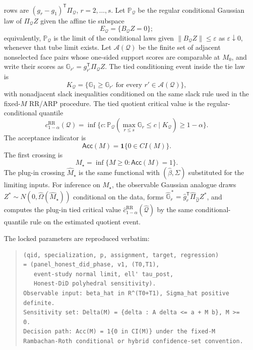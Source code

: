 \documentclass[11pt]{article}
\renewcommand{\Pr}{\mathbb{P}}
\newcommand{\one}{\mathbf{1}}
\newcommand{\transpose}{\mathsf{T}}
\theoremstyle{definition}
\theoremstyle{plain}
\theoremstyle{remark}
\begin{document}
rows are \((g_r-g_1)^\transpose\Pi_{\mathcal{Q}}\), \(r=2,\ldots,s\).  Let
\(\Pr_{\mathcal{Q}}\) be the regular conditional Gaussian law of
\(\Pi_{\mathcal{Q}}Z\) given the affine tie subspace
\[
E_{\mathcal{Q}}=\{B_{\mathcal{Q}}Z=0\};
\]
equivalently, \(\Pr_{\mathcal{Q}}\) is the limit of the conditional laws given
\(\|B_{\mathcal{Q}}Z\|\le\varepsilon\) as \(\varepsilon\downarrow 0\), whenever
that tube limit exists.  Let \(\mathcal{A}(\mathcal{Q})\) be the finite set of
adjacent nonselected face pairs whose one-sided support scores are comparable
at \(M_0\), and write their scores as
\(\mathbb{G}_{r'}=g_{r'}^\transpose\Pi_{\mathcal{Q}}Z\).  The tied
conditioning event inside the tie law is
\[
K_{\mathcal{Q}}
=\{\mathbb{G}_1
\ge \mathbb{G}_{r'}\text{ for every }r'\in\mathcal{A}(\mathcal{Q})\},
\]
with nonadjacent slack inequalities conditioned on the same slack rule used in
the fixed-\(M\) RR/ARP procedure.  The tied quotient critical value is the
regular-conditional quantile
\[
c_{1-\alpha}^{\mathrm{RR}}(\mathcal{Q})
=\inf\{c:\Pr_{\mathcal{Q}}(\max_{r\le s}\mathbb{G}_r\le c\mid
K_{\mathcal{Q}})\ge 1-\alpha\}.
\]
The acceptance indicator is
\[
\mathsf{Acc}(M)=\one\{0\in CI(M)\}.
\]
The first crossing is
\[
M_\star=\inf\{M\ge 0:\mathsf{Acc}(M)=1\}.
\]
The plug-in crossing \(\widehat M_\star\) is the same functional with
\((\widehat\beta,\widehat\Sigma)\) substituted for the limiting inputs.
For inference on \(M_\star\), the observable Gaussian analogue draws
\(Z^\ast\sim N(0,\widehat\Omega(\widehat M_\star))\) conditional on the data,
forms \(\widehat{\mathbb{G}}_r^{\,\ast}
=\widehat g_r^\transpose\widehat\Pi_{\widehat{\mathcal{Q}}}Z^\ast\), and
computes the plug-in tied critical value
\(\widehat c_{1-\alpha}^{\mathrm{RR}}(\widehat{\mathcal{Q}})\) by the same
conditional-quantile rule on the estimated quotient event.

The locked parameters are reproduced verbatim:
\begin{quote}
\begin{verbatim}
(qid, specialization, p, assignment, target, regression)
= (panel_honest_did_phase, v1, (T0,T1),
   event-study normal limit, ell' tau_post,
   Honest-DiD polyhedral sensitivity).
Observable input: beta_hat in R^(T0+T1), Sigma_hat positive definite.
Sensitivity set: Delta(M) = {delta : A delta <= a + M b}, M >= 0.
Decision path: Acc(M) = 1{0 in CI(M)} under the fixed-M
Rambachan-Roth conditional or hybrid confidence-set convention.
\end{verbatim}
\end{quote}
\end{document}

